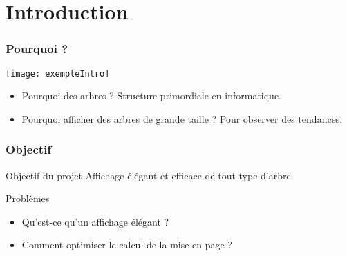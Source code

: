 \section{Introduction}

\begin{frame}[allowframebreaks]
	\frametitle{Pourquoi ?}
	\begin{center}
		\texttt{[image: exempleIntro]} \\
		\begin{itemize}
			\item Pourquoi des arbres ? Structure primordiale en informatique. 
			\item Pourquoi afficher des arbres de grande taille ? Pour observer des tendances. %
		\end{itemize}
	\end{center}
\end{frame}

\begin{frame}
	\frametitle{Objectif}
	\begin{block}{Objectif du projet}
		Affichage élégant et efficace de tout type d'arbre
	\end{block}
	\begin{alertblock}{Problèmes}
		\begin{itemize}
			\item Qu'est-ce qu'un affichage élégant ?
			\item Comment optimiser le calcul de la mise en page ?
		\end{itemize}
	\end{alertblock}
\end{frame}


